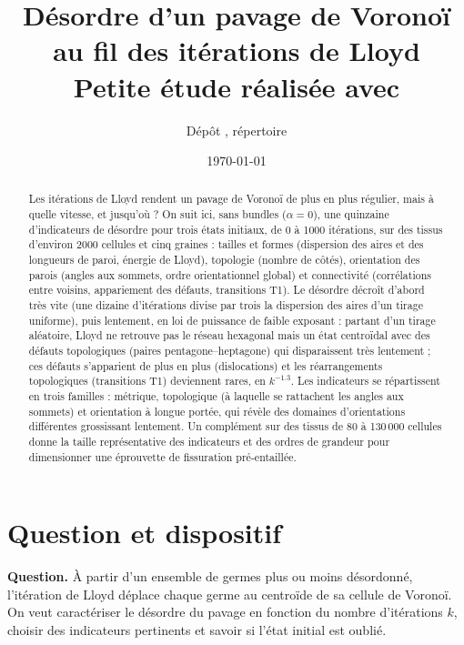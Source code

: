 \documentclass[10pt,a4paper]{article}
\title{Désordre d'un pavage de Voronoï au fil des itérations de Lloyd\\[3pt]
  \large Petite étude réalisée avec \code{cellyod}}
\author{Dépôt \code{cellYOd}, répertoire \code{etudes/lloyd\_desordre}}
\date{\today}
\begin{document}
\maketitle

\begin{abstract}
  Les itérations de Lloyd rendent un pavage de Voronoï de plus en plus régulier, mais à quelle vitesse, et
  jusqu'où ? On suit ici, sans bundles ($\alpha=0$), une quinzaine d'indicateurs de désordre pour trois états
  initiaux, de 0 à 1000 itérations, sur des tissus d'environ 2000 cellules et cinq graines : tailles et formes
  (dispersion des aires et des longueurs de paroi, énergie de Lloyd), topologie (nombre de côtés), orientation
  des parois (angles aux sommets, ordre orientationnel global) et connectivité (corrélations entre voisins,
  appariement des défauts, transitions T1). Le désordre décroît d'abord très
  vite (une dizaine d'itérations divise par trois la dispersion des aires d'un tirage uniforme), puis lentement,
  en loi de puissance de faible exposant : partant d'un tirage aléatoire, Lloyd ne retrouve pas le réseau
  hexagonal mais un état centroïdal avec des défauts topologiques (paires pentagone--heptagone) qui
  disparaissent très lentement ; ces défauts s'apparient de plus en plus (dislocations) et les réarrangements
  topologiques (transitions T1) deviennent rares, en $k^{-1.3}$. Les indicateurs se répartissent en trois
  familles : métrique, topologique (à laquelle se rattachent les angles aux sommets) et orientation à longue
  portée, qui révèle des domaines d'orientations différentes grossissant lentement. Un complément sur des tissus
  de 80 à 130\,000 cellules donne la taille représentative des indicateurs et des ordres de grandeur pour
  dimensionner une éprouvette de fissuration pré-entaillée.
\end{abstract}

\section{Question et dispositif}

\textbf{Question.} À partir d'un ensemble de germes plus ou moins désordonné, l'itération de Lloyd déplace chaque
germe au centroïde de sa cellule de Voronoï. On veut caractériser le désordre du pavage en fonction du nombre
d'itérations $k$, choisir des indicateurs pertinents et savoir si l'état initial est oublié.
\end{document}
